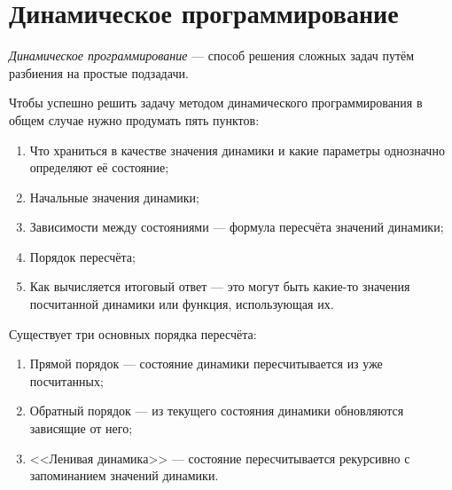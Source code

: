 \section{Динамическое программирование}

\textit{Динамическое программирование} --- способ решения сложных задач путём разбиения на простые подзадачи.

Чтобы успешно решить задачу методом динамического программирования в общем случае
нужно продумать пять пунктов:
\begin{enumerate}
\item Что храниться в качестве значения динамики и какие параметры однозначно определяют её состояние;
\item Начальные значения динамики;
\item Зависимости между состояниями --- формула пересчёта значений динамики;
\item Порядок пересчёта;
\item Как вычисляется итоговый ответ --- это могут быть какие-то значения посчитанной динамики или функция, использующая их.
\end{enumerate}

Существует три основных порядка пересчёта:
\begin{enumerate}
\item Прямой порядок --- состояние динамики пересчитывается из уже посчитанных;
\item Обратный порядок --- из текущего состояния динамики обновляются зависящие от него;
\item <<Ленивая динамика>> --- состояние пересчитывается рекурсивно с запоминанием значений динамики.
\end{enumerate}